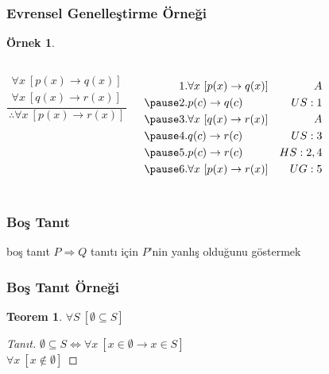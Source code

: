 \documentclass[dvipsnames]{beamer}
\theoremstyle{definition}
\theoremstyle{example}
\newtheorem{ornek}[theorem]{Örnek}
\theoremstyle{plain}
\newtheorem{teorem}[theorem]{Teorem}
\begin{document}
\begin{frame}
  \frametitle{Evrensel Genelleştirme Örneği}

  \begin{ornek}
    \begin{columns}
      \[
      \frac
        {
          \begin{array}{c}
            \forall x~[p(x) \rightarrow q(x)]\\
            \forall x~[q(x) \rightarrow r(x)]
          \end{array}
        }
        {
          \therefore \forall x~[p(x) \rightarrow r(x)]
        }
      \]

      \pause
      \begin{eqnarray*}
        1. & \forall x~[p(x) \rightarrow q(x)] & A\\\pause
        2. & p(c) \rightarrow q(c)             & US:1\\\pause
        3. & \forall x~[q(x) \rightarrow r(x)] & A\\\pause
        4. & q(c) \rightarrow r(c)             & US:3\\\pause
        5. & p(c) \rightarrow r(c)             & HS:2,4\\\pause
        6. & \forall x~[p(x) \rightarrow r(x)] & UG:5
      \end{eqnarray*}
    \end{columns}
  \end{ornek}
\end{frame}

\begin{frame}
  \frametitle{Boş Tanıt}

  \begin{block}{boş tanıt}
    $P \Rightarrow Q$ tanıtı için $P$'nin yanlış olduğunu göstermek
  \end{block}
\end{frame}

\begin{frame}
  \frametitle{Boş Tanıt Örneği}

  \begin{teorem}
    $\forall S~[\emptyset \subseteq S]$
  \end{teorem}

  \pause
  \begin{proof}[Tanıt]
    $\emptyset \subseteq S \Leftrightarrow
      \forall x~[x \in \emptyset \rightarrow x \in S]$\\\pause
    $\forall x~[x \notin \emptyset]$
  \end{proof}
\end{frame}
\end{document}
